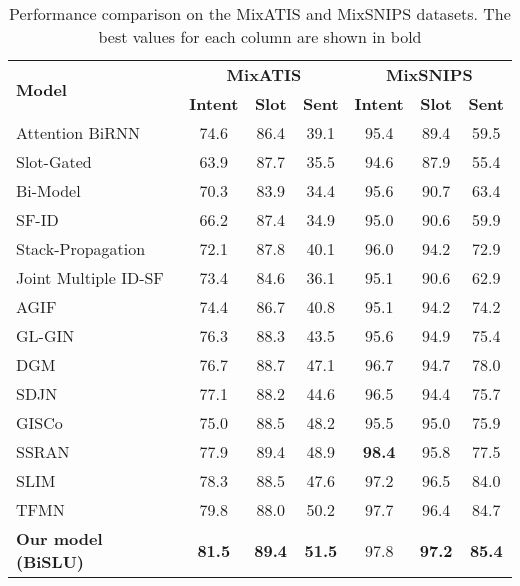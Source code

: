 \documentclass{ecai}
\begin{document}
\begin{table*}[t]
\centering
\caption{Performance comparison on the MixATIS and MixSNIPS datasets. The best values for each column
are shown in bold}
\label{tab:Results}
\begin{tabular}{|l|c|c|c|c|c|c|}
\hline
\multirow{2}{*}{\textbf{Model}} & \multicolumn{3}{|c|}{\textbf{MixATIS}} &	\multicolumn{3}{|c|}{\textbf{MixSNIPS}} \\
\cline{2-7}
& \textbf{Intent} &	\textbf{Slot} &	\textbf{Sent} & \textbf{Intent} &	\textbf{Slot} &	\textbf{Sent} \\
\hline
\hline
Attention BiRNN \cite{liu:2016}&	74.6 &	86.4 &	39.1 &	95.4 &	89.4 &	59.5\\
\hline
Slot-Gated \cite{Goo:2018}& 63.9&	87.7	&35.5	&94.6	&87.9	&55.4\\
\hline
Bi-Model \cite{wang:2018} & 70.3 & 	83.9 & 	34.4 & 	95.6 & 	90.7 & 	63.4\\
\hline
SF-ID \cite{Haihong:2019} & 66.2 & 	87.4 & 	34.9 & 	95.0 & 	90.6 & 	59.9\\
\hline
Stack-Propagation \cite{Qin:2019}& 72.1 & 	87.8 & 	40.1 & 	96.0 & 	94.2 & 	72.9\\
\hline
Joint Multiple ID-SF \cite{gangadharaiah-narayanaswamy:2019} &	73.4 &		84.6 &		36.1 &		95.1 &		90.6 &		62.9\\
\hline
AGIF \cite{qin:2020}& 74.4 & 	86.7 & 	40.8 & 	95.1 & 	94.2 & 	74.2\\
\hline
GL-GIN \cite{qin:2021}&76.3 &	88.3 &	43.5 &	95.6 &	94.9 &	75.4\\
\hline
DGM \cite{ding:2021}&76.7 &	88.7 &	47.1 &	96.7 &	94.7 &	78.0\\
\hline
SDJN \cite{chen:2022} &77.1 &	88.2 &	44.6 &	96.5 &	94.4 &	75.7\\
\hline
GISCo \cite{song:2022} &75.0 &	88.5 &	48.2 &	95.5 &	95.0&	75.9 \\
\hline
SSRAN \cite{cheng:2023} &77.9 &	89.4 &	48.9 &	\textbf{98.4} &	95.8&	77.5 \\
\hline
SLIM \cite{cai:2022}&78.3 &	88.5 &	47.6 &	97.2 &	96.5&	84.0 \\
\hline
TFMN \cite{chen-coling:2022}  & 79.8 &	88.0 &	50.2 &	97.7 &	96.4 &	84.7 \\
\hline
\hline
\textbf{Our model (BiSLU)} &	\textbf{81.5} &	\textbf{89.4} &	\textbf{51.5} & 97.8 & \textbf{97.2} & \textbf{85.4}\\\hline
\end{tabular}
\end{table*}
\end{document}
